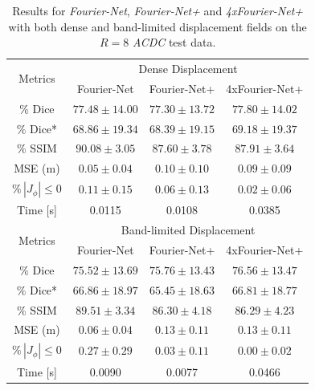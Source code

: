 \documentclass[english,version-2022-01]{uzl-thesis} %
\begin{document}
\begin{table}[H] %
	\centering
	\caption{Results for \emph{Fourier-Net}, \emph{Fourier-Net+} and \emph{4xFourier-Net+} with both dense and band-limited displacement fields on the $R=8$ \emph{ACDC} test data.}
	\label{tab:DenseDisplacementAcc8}
	\begin{tabular}{c c c c} %
		\toprule
		\multirow{2}{*}{Metrics} & \multicolumn{3}{c}{Dense Displacement} \\
		\cline{2-4} 
		 & Fourier-Net & Fourier-Net+ & 4xFourier-Net+\\	
		\midrule
		$\%$ Dice & $77.48 \pm 14.00$ & $77.30 \pm 13.72$ & $77.80 \pm 14.02$\\
		$\%$ Dice* & $68.86 \pm 19.34$ & $68.39 \pm 19.15$ & $69.18 \pm 19.37$ \\
		$\%$ SSIM & $90.08 \pm 3.05$ & $87.60 \pm 3.78$ & $87.91 \pm 3.64$\\
		MSE (m) & $0.05 \pm 0.04$ & $0.10 \pm 0.10$ & $0.09 \pm 0.09$ \\
		$\% \, |J_{\phi}|\leq0$ & $0.11 \pm 0.15$ & $0.06 \pm 0.13$ & $0.02 \pm 0.06$ \\
		Time [s] 	  & 0.0115 & 0.0108 & 0.0385  \\
		\midrule
		\multirow{2}{*}{Metrics} & \multicolumn{3}{c}{Band-limited Displacement} \\
		\cline{2-4} 
		 & Fourier-Net & Fourier-Net+ & 4xFourier-Net+\\		
		\midrule
		$\%$ Dice & $75.52 \pm 13.69$ & $75.76 \pm 13.43$ & $76.56 \pm 13.47$\\
		$\%$ Dice* & $66.86 \pm 18.97$ & $65.45 \pm 18.63$ & $66.81 \pm 18.77$ \\
		$\%$ SSIM & $89.51 \pm 3.34$ & $86.30 \pm 4.18$ & $86.29 \pm 4.23$\\
		MSE (m) & $0.06 \pm 0.04$ & $0.13 \pm 0.11$ & $0.13 \pm 0.11$ \\
		$\% \, |J_{\phi}|\leq0$ & $0.27 \pm 0.29$ & $0.03 \pm 0.11$ & $0.00 \pm 0.02$ \\
		Time [s] 	  & 0.0090 & 0.0077 & 0.0466  \\
		\bottomrule
	\end{tabular}	
\end{table}
\end{document}
